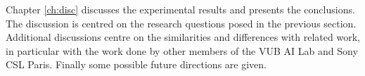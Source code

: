 Chapter \ref{ch:disc} discusses the experimental results and presents the conclusions. The discussion is centred on the research questions posed in the previous section. Additional discussions centre on the similarities and differences with related work, in particular with the work done by other members of the VUB AI Lab and Sony CSL Paris. Finally some possible future directions are given.




